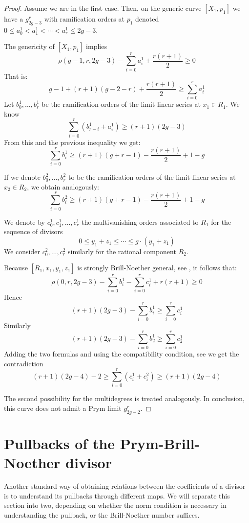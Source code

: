 \documentclass{article}
\theoremstyle{plain}
\theoremstyle{definition}
\begin{document}
\begin{proof}
Assume we are in the first case. Then, on the generic curve $[X_1, p_1]$ we have a $g^r_{2g-3}$ with ramification orders at $p_1$ denoted $0\leq a_0^1 < a_1^1 <\cdots < a_r^1 \leq 2g-3$. 

The genericity of $[X_1,p_1]$ implies 
\[ \rho(g-1,r,2g-3) - \sum_{i=0}^r a_i^1 +\frac{r(r+1)}{2} \geq 0 \]
That is: 
\[ g-1 + (r+1)(g-2-r) + \frac{r(r+1)}{2} \geq \sum_{i=0}^r a^1_i\]
Let $b_0^1,\ldots, b_r^1$ be the ramification orders of the limit linear series at $x_1 \in R_1$. We know 
\[ \sum_{i=0}^r(b_{r-i}^1 + a_i^1) \geq (r+1)(2g-3) \]
From this and the previous inequality we get: 
\[ \sum_{i=0}^rb_i^1 \geq (r+1)(g+r-1) - \frac{r(r+1)}{2} + 1-g \]

If we denote $b_0^2,\ldots, b_r^2$ to be the ramification orders of the limit linear series at $x_2 \in R_2$, we obtain analogously: 
\[ \sum_{i=0}^rb_i^2 \geq (r+1)(g+r-1) - \frac{r(r+1)}{2} + 1-g \] 

We denote by $c^1_0, c^1_1,\ldots, c^1_r$ the multivanishing orders associated to $R_1$ for the sequence of divisors
\[ 0 \leq y_1+ z_1 \leq \cdots \leq g\cdot (y_1+ z_1) \]
We consider $c^2_0,\ldots, c_r^2$ similarly for the rational component $R_2$. 

Because $[R_1, x_1, y_1, z_1]$ is strongly Brill-Noether general, see \cite[Definition 3.2 and Theorem 3.3]{Ossermandim}, it follows that: 
\[ \rho(0,r,2g-3) - \sum_{i=0}^rb_i^1 - \sum_{i=0}^r c_i^1 + r(r+1) \geq 0 \]
Hence 
\[ (r+1)(2g-3) - \sum_{i=0}^rb_i^1 \geq \sum_{i=0}^r c_i^1 \]
Similarly
\[ (r+1)(2g-3) - \sum_{i=0}^rb_2^1 \geq \sum_{i=0}^r c_2^1 \]
Adding the two formulas and using the compatibility condition, see \cite[Definition 2.16]{Ossermandim} we get the contradiction 
\[ (r+1)(2g-4)-2 \geq \sum_{i=0}^{r}(c^1_i+c^2_i) \geq (r+1)(2g-4) \]

The second possibility for the multidegrees is treated analogously. In conclusion, this curve does not admit a Prym limit $g^r_{2g-2}$.
\end{proof}
\section{Pullbacks of the Prym-Brill-Noether divisor} \label{pullbacks}

Another standard way of obtaining relations between the coefficients of a divisor is to understand its pullbacks through different maps. We will separate this section into two, depending on whether the norm condition is necessary in understanding the pullback, or the Brill-Noether number suffices.  
\end{document}
